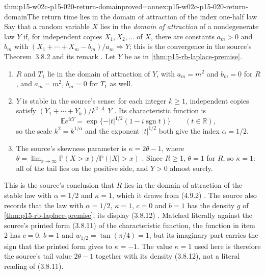 \begin{hbtheorem}{thm:p15-w02c-p15-020-return-domain}{proved=annex:p15-w02c-p15-020-return-domain}{The return time lies in the domain of attraction of the index one-half law}
Say that a random variable \(X\) lies in the \emph{domain of
attraction} of a nondegenerate law \(Y\) if, for independent copies
\(X_1,X_2,\ldots\) of \(X\), there are constants \(a_m>0\) and
\(b_m\) with \((X_1+\cdots+X_m-b_m)/a_m\Rightarrow Y\); this is the
convergence in the source's Theorem~3.8.2 and its remark
\cite[Section~3.8, p.~186]{DurrettPTEAuthor2019}. Let \(Y\) be as in
\cref{thm:p15-rb-laplace-premise}.
\begin{enumerate}
\item \(R\) and \(T_1\) lie in the domain of attraction of \(Y\), with
 \(a_m=m^2\) and \(b_m=0\) for \(R\), and \(a_m=m^2\), \(b_m=0\) for
 \(T_1\) as well.
\item \(Y\) is stable in the source's sense: for each integer
 \(k\geq1\), independent copies satisfy
 \((Y_1+\cdots+Y_k)/k^2\stackrel{\mathrm d}=Y\)
 \cite[Section~3.8, p.~191]{DurrettPTEAuthor2019}. Its characteristic
 function is
 \[
  \mathbb Ee^{itY}=\exp\{-|t|^{1/2}(1-i\operatorname{sgn}t)\}
  \qquad(t\in\mathbb R),
 \]
 so the scale \(k^2=k^{1/\alpha}\) and the exponent \(|t|^{1/2}\) both
 give the index \(\alpha=1/2\).
\item The source's skewness parameter is \(\kappa=2\theta-1\), where
 \(\theta=\lim_{x\to\infty}\mathbb P(X>x)/\mathbb P(|X|>x)\)
 \cite[Section~3.8, pp.~186 and 189]{DurrettPTEAuthor2019}. Since
 \(R\geq1\), \(\theta=1\) for \(R\), so \(\kappa=1\): all of the tail
 lies on the positive side, and \(Y>0\) almost surely.
\end{enumerate}
This is the source's conclusion that \(R\) lies in the domain of
attraction of the stable law with \(\alpha=1/2\) and \(\kappa=1\),
which it draws from (4.9.2) \cite[p.~264]{DurrettPTEAuthor2019}.
The source also records that the law with \(\alpha=1/2\),
\(\kappa=1\), \(c=0\) and \(b=1\) has the density \(g\) of
\cref{thm:p15-rb-laplace-premise}, its display (3.8.12)
\cite[Section~3.8, p.~189]{DurrettPTEAuthor2019}. Matched literally
against the source's printed form (3.8.11) of the characteristic
function, the function in item 2 has \(c=0\), \(b=1\) and
\(w_{1/2}=\tan(\pi/4)=1\), but its imaginary part carries the sign that
the printed form gives to \(\kappa=-1\). The value \(\kappa=1\) used
here is therefore the source's tail value \(2\theta-1\) together with
its density (3.8.12), not a literal reading of (3.8.11).
\end{hbtheorem}

